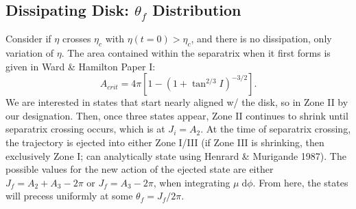 \documentclass[11pt,
        usenames, %
        dvipsnames %
    ]{article}
\newcommand*{\p}[1]{\left(#1\right)}
\newcommand*{\s}[1]{\left[#1\right]}
\begin{document}
\subsection{Dissipating Disk: $\theta_f$ Distribution}

Consider if $\eta$ crosses $\eta_c$ with $\eta(t = 0) > \eta_c$, and there is no
dissipation, only variation of $\eta$. The area contained within the separatrix
when it first forms is given in Ward \& Hamilton Paper I\@:
\begin{equation}
    A_{crit} = 4\pi \s{1 - \p{1 + \tan^{2/3}I}^{-3/2}}.
\end{equation}
We are interested in states that start nearly aligned w/ the disk, so in Zone II
by our designation. Then, once three states appear, Zone II continues to shrink
until separatrix crossing occurs, which is at $J_i = A_2$. At the time of
separatrix crossing, the trajectory is ejected into either Zone I/III (if Zone
III is shrinking, then exclusively Zone I\@; can analytically state using
Henrard \& Murigande 1987). The possible values for the new action of the
ejected state are either $J_f = A_2 + A_3 - 2\pi$ or $J_f = A_3 - 2\pi$, when
integrating $\mu\;\mathrm{d}\phi$. From here, the states will precess uniformly
at some $\theta_f = J_f / 2\pi$.
\end{document}
